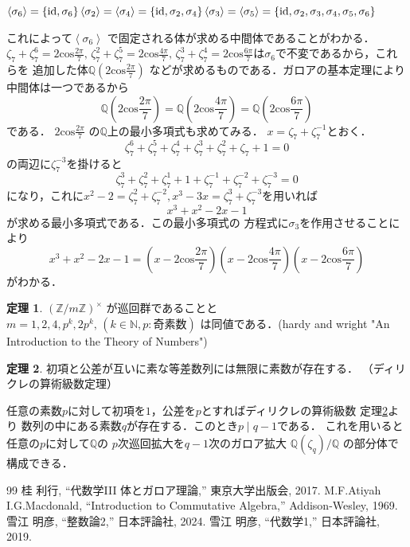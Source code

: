 \documentclass[dvipdfmx,a4paper,12pt]{jsarticle}
\newcommand{\uref}[1]{\hyperref[#1]{\textcolor{TiffanyBlue}{\underline{\ref*{#1}}}}}
\theoremstyle{definition}
\newtheorem{theorem}{定理}[section]
\begin{document}
$\left< \sigma_6 \right>=\{\mathrm{id},\sigma_6\}\\
\left< \sigma_2 \right>=
\left< \sigma_4 \right>=\{\mathrm{id},\sigma_2,\sigma_4\}\\
\left< \sigma_3 \right>=
\left< \sigma_5 \right>=\{\mathrm{id},\sigma_2,\sigma_3,
\sigma_4,\sigma_5,\sigma_6\}$

これによって$\left< \sigma_6 \right>$
で固定される体が求める中間体であることがわかる．
$\displaystyle
\zeta_7+\zeta_7^6=2\mathrm{cos}\frac{2\pi}{7},\,
\zeta_7^2+\zeta_7^5=2\mathrm{cos}\frac{4\pi}{7},\,
\zeta_7^3+\zeta_7^4=2\mathrm{cos}\frac{6\pi}{7}
$は$\sigma_6$で不変であるから，これらを
追加した体$\displaystyle\mathbb{Q}(2\mathrm{cos}\frac{2\pi}{7})$
などが求めるものである．ガロアの基本定理により
中間体は一つであるから
\[
    \mathbb{Q}(2\mathrm{cos}\frac{2\pi}{7})=
    \mathbb{Q}(2\mathrm{cos}\frac{4\pi}{7})=
    \mathbb{Q}(2\mathrm{cos}\frac{6\pi}{7})
\]
である．
$\displaystyle 2\mathrm{cos}\frac{2\pi}{7}$
の$\mathbb{Q}$上の最小多項式も求めてみる．
$x=\zeta_7+\zeta_7^{-1}$とおく．
\[
\zeta_7^6+\zeta_7^5+\zeta_7^4+\zeta_7^3+\zeta_7^2+\zeta_7+1=0
\]
の両辺に$\zeta_7^{-3}$を掛けると
\[
\zeta_7^3+\zeta_7^2+\zeta_7^1+1+\zeta_7^{-1}+\zeta_7^{-2}+\zeta_7^{-3}=0
\]
になり，これに$x^2-2=\zeta_7^2+\zeta_7^{-2},
x^3-3x=\zeta_7^3+\zeta_7^{-3}$を用いれば
\[
x^3+x^2-2x-1
\]
が求める最小多項式である．この最小多項式の
方程式に$\sigma_3$を作用させることにより
\[
x^3+x^2-2x-1=(x-2\mathrm{cos}\frac{2\pi}{7})
(x-2\mathrm{cos}\frac{4\pi}{7})
(x-2\mathrm{cos}\frac{6\pi}{7})
\]
がわかる．
\begin{theorem}
    $(\mathbb{Z}/m\mathbb{Z})^\times$
    が巡回群であることと
    $m=1,2,4,p^k,2p^k,\,(k\in\mathbb{N},p\colon \text{奇素数})$
    は同値である．(hardy and wright "An Introduction to the 
    Theory of Numbers")
\end{theorem}

\begin{theorem}\label{dirichlet}
    初項と公差が互いに素な等差数列には無限に素数が存在する．
    （ディリクレの算術級数定理）
\end{theorem}
任意の素数$p$に対して初項を$1$，公差を$p$とすればディリクレの算術級数
定理\uref{dirichlet}より
数列の中にある素数$q$が存在する．このとき$p\mid q-1$である．
これを用いると任意の$p$に対して$\mathbb{Q}$の
$p$次巡回拡大を$q-1$次のガロア拡大
$\mathbb{Q}(\zeta_q)/\mathbb{Q}$
の部分体で構成できる．


\begin{thebibliography}{99}
 桂 利行, ``代数学III 体とガロア理論,'' 東京大学出版会, 2017.
 M.F.Atiyah I.G.Macdonald, 
``Introduction to Commutative Algebra,'' Addison-Wesley, 1969.
 雪江 明彦, ``整数論2,'' 日本評論社, 2024.
 雪江 明彦, ``代数学1,'' 日本評論社, 2019.
\end{thebibliography}
\end{document}
